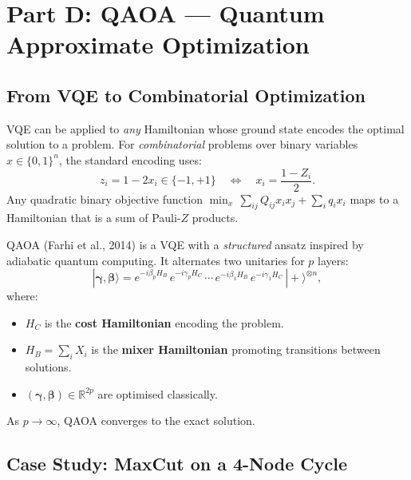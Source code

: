 \documentclass[a4paper,11pt]{article}
\renewcommand{\ket}[1]{|#1\rangle}
\begin{document}
\section{Part D: QAOA — Quantum Approximate Optimization}
\label{sec:qaoa-circ}

\subsection{From VQE to Combinatorial Optimization}

VQE can be applied to \emph{any} Hamiltonian whose ground state encodes the
optimal solution to a problem. For \emph{combinatorial} problems over binary
variables $x \in \{0,1\}^n$, the standard encoding uses:
\begin{equation}
    z_i = 1 - 2x_i \in \{-1,+1\} \quad\Longleftrightarrow\quad
    x_i = \frac{1-Z_i}{2}.
\end{equation}
Any quadratic binary objective function
$\min_x\,\sum_{ij} Q_{ij} x_i x_j + \sum_i q_i x_i$
maps to a Hamiltonian that is a sum of Pauli-$Z$ products.

QAOA (Farhi et al., 2014) is a VQE with a \emph{structured} ansatz inspired
by adiabatic quantum computing. It alternates two unitaries for $p$ layers:
\begin{equation}
    \ket{\boldsymbol\gamma,\boldsymbol\beta}
    = e^{-i\beta_p H_B}\,e^{-i\gamma_p H_C}\,\cdots\,
      e^{-i\beta_1 H_B}\,e^{-i\gamma_1 H_C}\,\ket{+}^{\otimes n},
\end{equation}
where:
\begin{itemize}
    \item $H_C$ is the \textbf{cost Hamiltonian} encoding the problem.
    \item $H_B = \sum_i X_i$ is the \textbf{mixer Hamiltonian} promoting
          transitions between solutions.
    \item $(\boldsymbol\gamma, \boldsymbol\beta) \in \mathbb{R}^{2p}$ are
          optimised classically.
\end{itemize}
As $p \to \infty$, QAOA converges to the exact solution.

\subsection{Case Study: MaxCut on a 4-Node Cycle}
\end{document}
